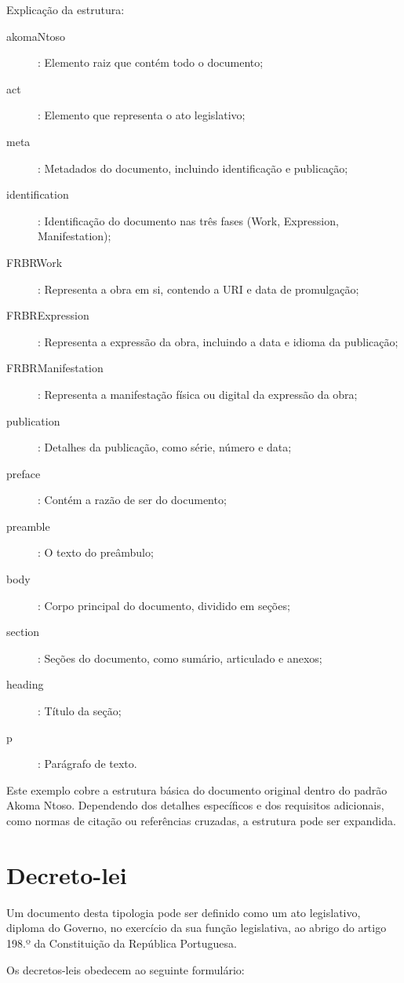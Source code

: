 Explicação da estrutura:
\begin{description}
\item[akomaNtoso]: Elemento raiz que contém todo o documento;
\item[act]: Elemento que representa o ato legislativo;
\item[meta]: Metadados do documento, incluindo identificação e publicação;
\item[identification]: Identificação do documento nas três fases (Work, Expression, Manifestation);
\item[FRBRWork]: Representa a obra em si, contendo a URI e data de promulgação;
\item[FRBRExpression]: Representa a expressão da obra, incluindo a data e idioma da publicação;
\item[FRBRManifestation]: Representa a manifestação física ou digital da expressão da obra;
\item[publication]: Detalhes da publicação, como série, número e data;
\item[preface]: Contém a razão de ser do documento;
\item[preamble]: O texto do preâmbulo;
\item[body]: Corpo principal do documento, dividido em seções;
\item[section]: Seções do documento, como sumário, articulado e anexos;
\item[heading]: Título da seção;
\item[p]: Parágrafo de texto.
\end{description}

Este exemplo cobre a estrutura básica do documento original dentro do padrão Akoma Ntoso. 
Dependendo dos detalhes específicos e dos requisitos adicionais, como normas de citação ou referências cruzadas, 
a estrutura pode ser expandida.


\section{Decreto-lei}

Um documento desta tipologia pode ser definido como um ato legislativo, diploma do Governo, no exercício 
da sua função legislativa, ao abrigo do artigo 198.º da Constituição da República Portuguesa.

Os decretos-leis obedecem ao seguinte formulário:

